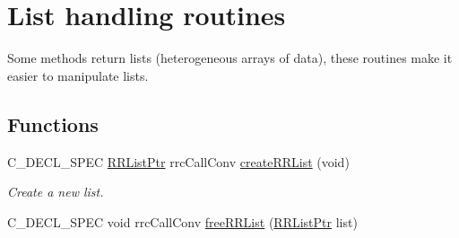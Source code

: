 \hypertarget{group__list}{}\section{List handling routines}
\label{group__list}


Some methods return lists (heterogeneous arrays of data), these routines make it easier to manipulate lists.  


\subsection*{Functions}
\begin{DoxyCompactItemize}
\item 
C\+\_\+\+D\+E\+C\+L\+\_\+\+S\+P\+E\+C \hyperlink{rrc__types_8h_a32a8a60ac06858ff3a791672bd2bec73}{R\+R\+List\+Ptr} rrc\+Call\+Conv \hyperlink{group__list_ga0d154a4c5f0aef656c333775638b2b7d}{create\+R\+R\+List} (void)
\begin{DoxyCompactList}\small\item\em Create a new list. \end{DoxyCompactList}\item 
\hypertarget{group__list_gafd22078b804cc5b7e39849fb51c7519a}{}C\+\_\+\+D\+E\+C\+L\+\_\+\+S\+P\+E\+C void rrc\+Call\+Conv \hyperlink{group__list_gafd22078b804cc5b7e39849fb51c7519a}{free\+R\+R\+List} (\hyperlink{rrc__types_8h_a32a8a60ac06858ff3a791672bd2bec73}{R\+R\+List\+Ptr} list)\label{group__list_gafd22078b804cc5b7e39849fb51c7519a}


\end{DoxyCompactItemize}
